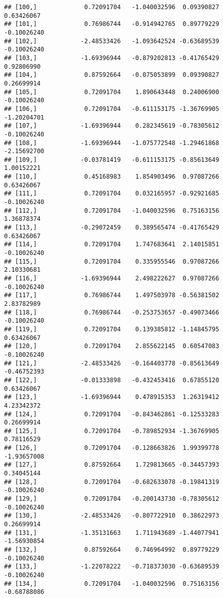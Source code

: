 \documentclass[
]{article}
\begin{document}
\begin{verbatim}
## [100,]             0.72091704   -1.040032596  0.09390827     0.63426067
## [101,]             0.76986744   -0.914942765  0.89779229    -0.10026240
## [102,]            -2.48533426   -1.093642524 -0.63689539    -0.10026240
## [103,]            -1.69396944   -0.879202813 -0.41765429     0.92806990
## [104,]             0.87592664   -0.075053899  0.09390827     0.26699914
## [105,]             0.72091704    1.890643448  0.24006900    -0.10026240
## [106,]             0.72091704   -0.611153175 -1.36769905    -1.20204701
## [107,]            -1.69396944    0.282345619 -0.78305612    -0.10026240
## [108,]            -1.69396944   -1.075772548 -1.29461868    -2.15692700
## [109,]            -0.03781419   -0.611153175 -0.85613649     1.00152221
## [110,]             0.45168983    1.854903496  0.97087266     0.63426067
## [111,]             0.72091704    0.032165957 -0.92921685    -0.10026240
## [112,]             0.72091704   -1.040032596  0.75163156     1.36878374
## [113,]            -0.29072459    0.389565474 -0.41765429     0.63426067
## [114,]             0.72091704    1.747683641  2.14015851    -0.10026240
## [115,]             0.72091704    0.335955546  0.97087266     2.10330681
## [116,]            -1.69396944    2.498222627  0.97087266    -0.10026240
## [117,]             0.76986744    1.497503978 -0.56381502     2.83782989
## [118,]             0.76986744   -0.253753657 -0.49073466    -0.10026240
## [119,]             0.72091704    0.139385812 -1.14845795     0.63426067
## [120,]             0.72091704    2.855622145  0.60547083    -0.10026240
## [121,]            -2.48533426   -0.164403778 -0.85613649    -0.46752393
## [122,]            -0.01333898   -0.432453416  0.67855120     0.63426067
## [123,]            -1.69396944    0.478915353  1.26319412     4.23342372
## [124,]             0.72091704   -0.843462861 -0.12533283     0.26699914
## [125,]             0.72091704   -0.789852934 -1.36769905     0.78116529
## [126,]             0.72091704   -0.128663826  1.99399778    -1.93657008
## [127,]             0.87592664    1.729813665 -0.34457393     0.34045144
## [128,]             0.72091704   -0.682633078 -0.19841319    -0.10026240
## [129,]             0.72091704   -0.200143730 -0.78305612    -0.10026240
## [130,]            -2.48533426   -0.807722910  0.38622973     0.26699914
## [131,]            -1.35131663    1.711943689 -1.44077941    -1.56930854
## [132,]             0.87592664    0.746964992  0.89779229    -0.10026240
## [133,]            -1.22078222   -0.718373030 -0.63689539    -0.10026240
## [134,]             0.72091704   -1.040032596  0.75163156    -0.68788086

\end{verbatim}
\end{document}
